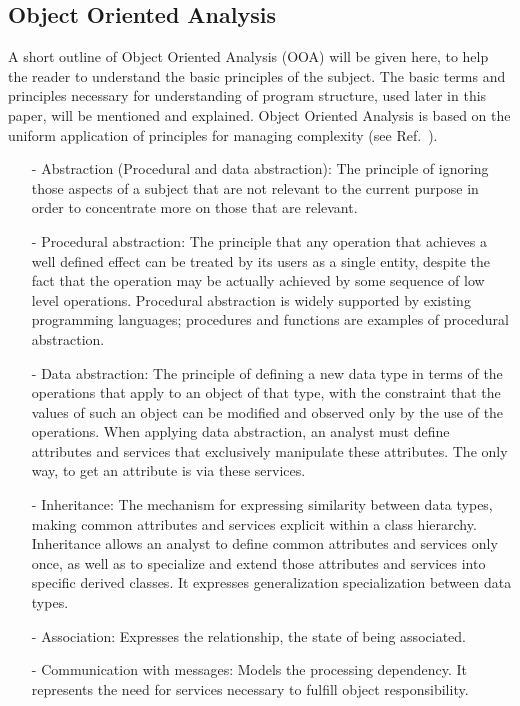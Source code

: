 \begin{htmlonly}
\begin{center}
\section{Object Oriented Analysis}
A short outline of Object Oriented Analysis (OOA) will be given here, to
help the reader to understand
the basic principles of the subject. The basic terms and
principles necessary for understanding of program structure, used
later in this paper, will be mentioned and explained. 
Object Oriented Analysis  is based on the uniform application of 
principles for managing complexity (see Ref.~\cite{CoadYourdon}).
\begin{itemize}
\item[-]
Abstraction (Procedural and data abstraction): The principle of ignoring
those aspects of a subject that are not relevant to the current purpose
in order to concentrate more on those that are relevant.
\item[-]
Procedural abstraction: The principle that any operation that achieves
a well defined effect can be treated by its users as a single entity,
despite the fact that the operation may be actually achieved by some
sequence of low level operations. Procedural abstraction is widely
supported by existing programming languages; procedures and functions
are examples of procedural abstraction.
\item[-]
Data abstraction: The principle of defining a new data type in terms of
the operations that apply to an object of that type, with the constraint
that the values of such an object can be modified and observed only by
the use of the operations. When applying data abstraction, an analyst
must define attributes and services that exclusively
manipulate these attributes. The only way, to get an attribute is via
these services.
\item[-]
Inheritance: The mechanism for expressing similarity between data types,
making common attributes and services explicit within a class
hierarchy. Inheritance allows an analyst to define common attributes
and services only once, as well as to specialize and extend those
attributes and services into specific derived classes. It expresses
generalization specialization between data types.
\item[-]
Association: Expresses the relationship, the state of being associated. 
\item[-]
Communication with messages: Models the processing dependency. It
represents the need for services necessary to fulfill object responsibility.
\end{itemize}


\end{center}
\end{htmlonly}
